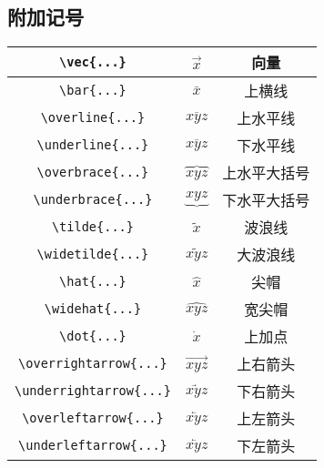 \documentclass[a4paper,10pt]{ctexart}
\begin{document}
\subsection{附加记号}
\noindent
\begin{table}[H]
	\begin{center}
		\begin{tabular}{|c|c|c|}
		\hline
		\verb|\vec{...}| &$\vec{x}$ &向量\\
		\hline
		\verb|\bar{...}| &$\bar{x}$ &上横线\\
		\hline
		\verb|\overline{...}| &$\overline{xyz}$ &上水平线\\
		\hline
		\verb|\underline{...}| &$\overline{xyz}$ &下水平线\\
		\hline
		\verb|\overbrace{...}| &$\overbrace{xyz}$ &上水平大括号\\
		\hline
		\verb|\underbrace{...}| &$\underbrace{xyz}$ &下水平大括号\\
		\hline
		\verb|\tilde{...}| &$\tilde{x}$ &波浪线\\
		\hline
		\verb|\widetilde{...}| &$\widetilde{xyz}$ &大波浪线\\
		\hline
		\verb|\hat{...}| &$\hat{x}$ &尖帽\\
		\hline
		\verb|\widehat{...}| &$\widehat{xyz}$ &宽尖帽\\
		\hline
		\verb|\dot{...}| &$\dot{x}$ &上加点\\
		\hline
		\verb|\overrightarrow{...}| &$\overrightarrow{xyz}$ &上右箭头\\
		\hline
		\verb|\underrightarrow{...}| &$\underrightarrow{xyz}$ &下右箭头\\
		\hline
		\verb|\overleftarrow{...}| &$\overleftarrow{xyz}$ &上左箭头\\
		\hline
		\verb|\underleftarrow{...}| &$\underleftarrow{xyz}$ &下左箭头\\
		\hline
		\end{tabular}
	\end{center}
\end{table}
\end{document}
